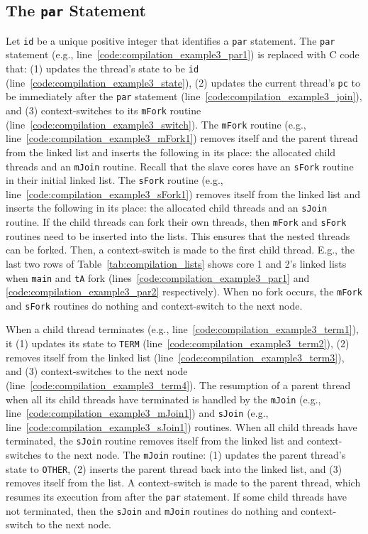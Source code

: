 \subsection{The \texttt{par} Statement}
\label{sec:compilation_par}
Let \verb$id$ be a unique positive integer that identifies a
\verb$par$ statement. The \verb$par$ statement (e.g., 
line~\ref{code:compilation_example3_par1}) is replaced
with C code that: (1) updates the thread's state to be \verb$id$
(line~\ref{code:compilation_example3_state}),
(2) updates the current thread's \verb$pc$ to be
immediately after the \verb$par$ statement 
(line~\ref{code:compilation_example3_join}), and (3)
context-switches to its \verb$mFork$ routine 
(line~\ref{code:compilation_example3_switch}). 
The \verb$mFork$ routine (e.g., line~\ref{code:compilation_example3_mFork1})
removes itself and the parent thread from the linked 
list and inserts the following in its place: the allocated 
child threads and an \verb$mJoin$ routine.
Recall that the slave cores have an \verb$sFork$
routine in their initial linked list. 
The \verb$sFork$ routine (e.g., line~\ref{code:compilation_example3_sFork1})
removes itself from the linked list and inserts the following in its
place: the allocated child threads and an \verb$sJoin$
routine. If the child threads can fork their own threads,
then \verb$mFork$ and \verb$sFork$ routines need to be
inserted into the lists. This ensures that the nested
threads can be forked. Then, a context-switch is made to the
first child thread. E.g., the last two rows of
Table~\ref{tab:compilation_lists} shows core 1 and 2's linked 
lists when \verb$main$ and \verb$tA$ fork 
(lines~\ref{code:compilation_example3_par1} and 
\ref{code:compilation_example3_par2} respectively). 
When no fork occurs, the \verb$mFork$ and \verb$sFork$ 
routines do nothing and context-switch to the next node. 

When a child thread terminates (e.g., line~\ref{code:compilation_example3_term1}), 
it (1) updates its state to \verb$TERM$ (line~\ref{code:compilation_example3_term2}), 
(2) removes itself from the linked list (line~\ref{code:compilation_example3_term3}), 
and (3) context-switches to the next node (line~\ref{code:compilation_example3_term4}).
The resumption of a parent thread when all its child threads
have terminated is handled by the \verb$mJoin$ 
(e.g., line~\ref{code:compilation_example3_mJoin1}) and
\verb$sJoin$ (e.g., line~\ref{code:compilation_example3_sJoin1}) 
routines. When all child threads have terminated, the
\verb$sJoin$ routine removes itself from the linked list and
context-switches to the next node. The \verb$mJoin$ routine:
(1) updates the parent thread's state to \verb$OTHER$, (2) 
inserts the parent thread back into the linked list, and (3)
removes itself from the list. A context-switch is made to the parent
thread, which resumes its execution from after the
\verb$par$ statement. If some child threads have not
terminated, then the \verb$sJoin$ and \verb$mJoin$ routines
do nothing and context-switch to the next node.



